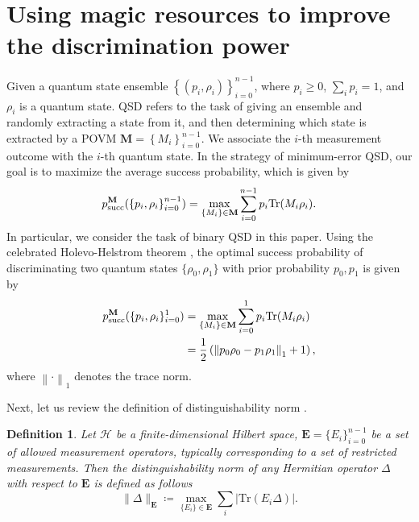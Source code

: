 \documentclass[aps,pra,twocolumn,floatfix,amsfonts,10pt]{revtex4-2}
\newtheorem{definition}{Definition}
\begin{document}
\section{Using magic resources to improve the discrimination power}
Given a quantum state ensemble $\left\{\left(p_i, \rho_i\right)\right\}_{i=0}^{n-1}$, where $p_i \geqslant 0$, $\sum_{i}p_i = 1$, and $\rho_i$ is a quantum state.
QSD refers to the task of giving an ensemble and randomly extracting a state from it, and then determining which state is extracted by a POVM $\mathbf{M}=\left\{M_i\right\}_{i=0}^{n-1}$.
We associate the $i$-th measurement outcome with the $i$-th quantum state. 
In the strategy of minimum-error QSD, our goal is to maximize the average success probability, which is given by
\begin{equation}
	p_{\rm{succ}}^{\mathbf{M}}(\left\{p_i, \rho_i\right\}_{i=0}^{n-1}) = \max_{\{M_i\}\in\mathbf{M}}\displaystyle\sum_{i=0}^{n-1}p_i\mathrm{Tr}(M_i\rho_i).
\end{equation}
In particular, we consider the task of binary QSD in this paper.
Using the celebrated Holevo-Helstrom theorem \cite{H1969,H1973}, the optimal success probability of discriminating two quantum states $\{\rho_0,\rho_1\}$ with prior probability $p_0,p_1$ is given by
\begin{equation}\label{Unrestricted QSD}
	\begin{aligned}
		p_{\rm{succ}}^{\mathbf{M}}(\{p_i,\rho_i\}_{i=0}^1) &= \max_{\{M_i\}\in\mathbf{M}}\displaystyle\sum_{i=0}^{1}p_i\mathrm{Tr}(M_i\rho_i) \\ &= \frac{1}{2}\left( \left\|p_0\rho_0-p_1\rho_1 \right\|_1+1 \right),
	\end{aligned}
\end{equation}
where $\left\|\cdot\right\|_1$ denotes the trace norm.

Next, let us review the definition of distinguishability norm \cite{MWW2009}.
\begin{definition}
	Let $\mathcal{H}$ be a finite-dimensional Hilbert space, $\mathbf{E}=\{E_i\}_{i=0}^{n-1}$ be a set of allowed measurement operators, typically corresponding to a set of restricted measurements.  
	Then the distinguishability norm of any Hermitian operator $\Delta$ with respect to $\mathbf{E}$ is defined as follows
	\begin{equation}
		\|\Delta\|_{\mathbf{E}} \coloneqq \max_{\{E_i\}\in\mathbf{E}} \sum_i \left| \mathrm{Tr}(E_i\Delta) \right|.
	\end{equation}
\end{definition}
\end{document}
